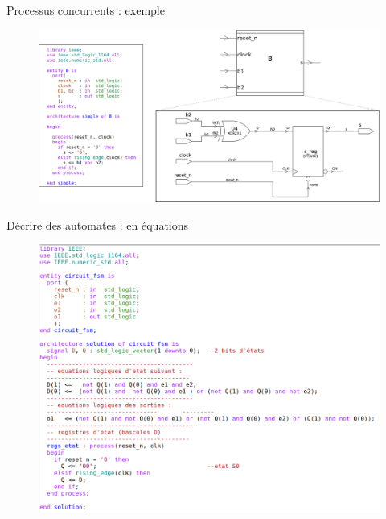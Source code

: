 \documentclass[xcolor=table]{beamer} %
\begin{document}
\begin{frame}{Processus concurrents : exemple}
  \begin{figure}[h]
    \centering
    \includegraphics[scale=0.25]{./figures/processus_sequentiel.png}
  \end{figure}
\end{frame}

\begin{frame}{Décrire des automates : en équations}
  \begin{figure}[h]
    \centering
    \includegraphics[scale=0.3]{./figures/vhdl_1.png}
  \end{figure}
\end{frame}
\end{document}
